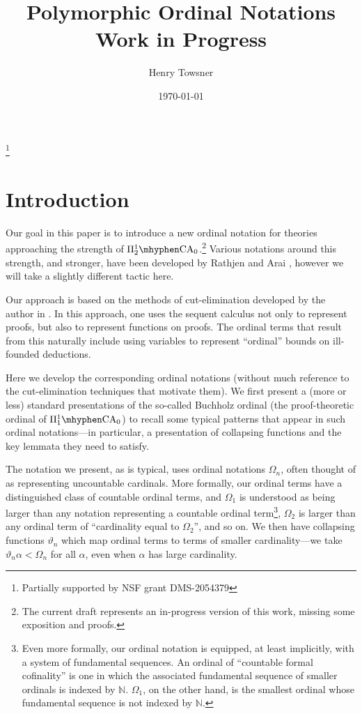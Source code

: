 \documentclass[11pt]{amsart}
\theoremstyle{definition}
\begin{document}
\title{Polymorphic Ordinal Notations\\{{Work in Progress}}}
\author{Henry Towsner}
\date{\today}
\thanks{Partially supported by NSF grant DMS-2054379}
\address {Department of Mathematics, University of Pennsylvania, 209 South 33rd Street, Philadelphia, PA 19104-6395, USA}


\maketitle

\section{Introduction}

Our goal in this paper is to introduce a new ordinal notation for theories approaching the strength of $\Pi^1_2\mhyphen\mathrm{CA}_0$.\footnote{The current draft represents an in-progress version of this work, missing some exposition and proofs.} Various notations around this strength, and stronger, have been developed by Rathjen and Arai \cite{RathjenStability,RathjenParameterFree,MR1791381,MR3443524,arai2024ordinal}, however we will take a slightly different tactic here.

Our approach is based on the methods of cut-elimination developed by the author in \cite{2403.17922,towsner:MR2499713}. In this approach, one uses the sequent calculus not only to represent proofs, but also to represent functions on proofs. The ordinal terms that result from this naturally include using variables to represent ``ordinal'' bounds on ill-founded deductions.

Here we develop the corresponding ordinal notations (without much reference to the cut-elimination techniques that motivate them). We first present a (more or less) standard presentations of the so-called Buchholz ordinal (the proof-theoretic ordinal of $\Pi^1_1\mhyphen\mathrm{CA}_0$) to recall some typical patterns that appear in such ordinal notations---in particular, a presentation of collapsing functions and the key lemmata they need to satisfy.

The notation we present, as is typical, uses ordinal notations $\Omega_n$, often thought of as representing uncountable cardinals. More formally, our ordinal terms have a distinguished class of countable ordinal terms, and $\Omega_1$ is understood as being larger than any notation representing a countable ordinal term\footnote{Even more formally, our ordinal notation is equipped, at least implicitly, with a system of fundamental sequences. An ordinal of ``countable formal cofinality'' is one in which the associated fundamental sequence of smaller ordinals is indexed by $\mathbb{N}$. $\Omega_1$, on the other hand, is the smallest ordinal whose fundamental sequence is not indexed by $\mathbb{N}$.}, $\Omega_2$ is larger than any ordinal term of ``cardinality equal to $\Omega_2$'', and so on. We then have collapsing functions $\vartheta_n$ which map ordinal terms to terms of smaller cardinality---we take $\vartheta_n\alpha<\Omega_n$ for all $\alpha$, even when $\alpha$ has large cardinality.
\end{document}
